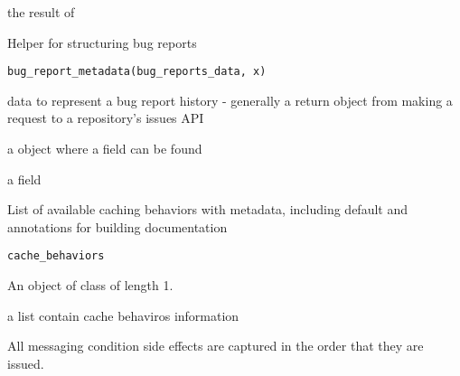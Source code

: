 \documentclass[a4paper]{book}
\begin{document}
%
\begin{Value}
the result of 
\end{Value}
%
\begin{Description}
Helper for structuring bug reports
\end{Description}
%
\begin{Usage}
\begin{verbatim}
bug_report_metadata(bug_reports_data, x)
\end{verbatim}
\end{Usage}
%
\begin{Arguments}
\begin{ldescription}
\item[\code{bug\_reports\_data}] data to represent a bug report history - generally a
return object from making a request to a repository's issues API

\item[\code{x}] a  object where a  field can be
found
\end{ldescription}
\end{Arguments}
%
\begin{Value}
a  field
\end{Value}
%
\begin{Description}
List of available caching behaviors with metadata, including default and
annotations for building documentation
\end{Description}
%
\begin{Usage}
\begin{verbatim}
cache_behaviors
\end{verbatim}
\end{Usage}
%
\begin{Format}
An object of class  of length 1.
\end{Format}
%
\begin{Value}
a list contain cache behaviros information
\end{Value}
%
\begin{Description}
All messaging condition side effects are captured in the order that they
are issued.
\end{Description}
\end{document}
